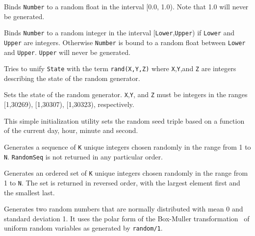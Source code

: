 
\begin{description}

 
%
Binds \texttt{Number} to a random float in the interval [0.0, 1.0).
Note that 1.0 will never be generated.

 
    Binds \texttt{Number} to a random integer in the interval
    [\texttt{Lower},\texttt{Upper}) if \texttt{Lower} and \texttt{Upper}
    are integers.  Otherwise \texttt{Number} is bound to a random float
    between \texttt{Lower} and \texttt{Upper}.  \texttt{Upper} will
    never be generated.

 
    Tries to unify \texttt{State} with the term \texttt{rand(X,Y,Z)}
    where \texttt{X},\texttt{Y},and \texttt{Z} are integers describing
    the state of the random generator.

 
    Sets the state of the random generator.  \texttt{X},\texttt{Y}, and
    \texttt{Z} must be integers in the ranges [1,30269), [1,30307),
    [1,30323), respectively.

 
This simple initialization utility sets the random seed triple based on a
function of the current day, hour, minute and second. 

 
    Generates a sequence of \texttt{K} unique integers chosen randomly
    in the range from 1 to \texttt{N}.  \texttt{RandomSeq} is not
    returned in any particular order.

 
    Generates an ordered set of \texttt{K} unique integers chosen
    randomly in the range from 1 to \texttt{N}.  The set is returned in
    reversed order, with the largest element first and the smallest
    last.

 
%
Generates two random numbers that are normally distributed with mean 0
and standard deviation 1.  It uses the polar form of the Box-Muller
transformation~\cite{BoxM58} of uniform random variables as generated by
{\tt random/1}.


\end{description}
